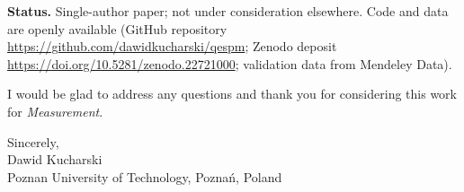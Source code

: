 \documentclass[11pt,a4paper]{article}
\begin{document}
\textbf{Status.}  Single-author paper; not under consideration
elsewhere.  Code and data are openly available (GitHub repository
\url{https://github.com/dawidkucharski/qespm}; Zenodo deposit
\url{https://doi.org/10.5281/zenodo.22721000}; validation data from
Mendeley Data).

I would be glad to address any questions and thank you for considering
this work for \emph{Measurement}.

\vspace{8pt}

Sincerely,\\[10pt]

Dawid Kucharski\\
Poznan University of Technology, Pozna\'n, Poland
\end{document}
